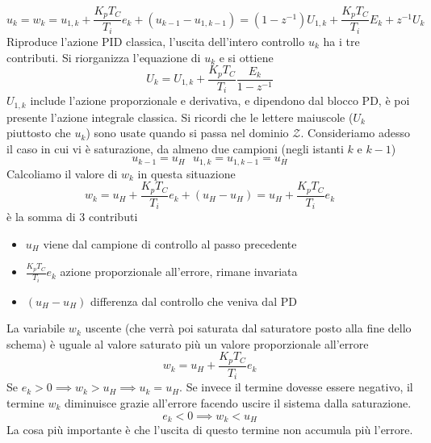 \documentclass[10pt, letterpaper]{report}
\begin{document}
$$ u_k=w_k=u_{1,k}+\frac{K_pT_C}{T_i}e_k+(u_{k-1}-u_{1,k-1})=(1-z^{-1})U_{1,k}+\frac{K_pT_C}{T_i}E_k+z^{-1}U_k$$
Riproduce l'azione PID classica, l'uscita dell'intero controllo $u_k$ ha i tre contributi. Si riorganizza l'equazione di $u_k$ e si ottiene 
$$ U_k=U_{1,k}+\frac{K_pT_C}{T_i}\frac{E_k}{1-z^{-1}}$$
$U_{1,k}$ include l'azione proporzionale e derivativa, e dipendono dal blocco PD, è poi presente l'azione integrale classica. Si ricordi che le lettere maiuscole ($U_k$ piuttosto che $u_k$) sono usate quando si passa nel dominio $\mathcal{Z}$.\acc 
Consideriamo adesso il caso in cui vi è saturazione, da almeno due campioni (negli istanti $k$ e $k-1$)
 $$u_{k-1}=u_H \ \ \ u_{1,k}=u_{1,k-1}=u_H $$
Calcoliamo il valore di $w_k$ in questa situazione 
$$ 
w_k=u_H+\frac{K_pT_C}{T_i}e_k+(u_H-u_H)=u_H+\frac{K_pT_C}{T_i}e_k
$$
è la somma di 3 contributi\begin{itemize}
    \item $u_H$ viene dal campione di controllo al passo precedente
    \item $\frac{K_pT_C}{T_i}e_k$ azione proporzionale all'errore, rimane invariata
    \item $(u_H-u_H)$ differenza dal controllo che veniva dal PD
\end{itemize}
La variabile $w_k$ uscente (che verrà poi saturata dal saturatore posto alla fine dello schema) è uguale al valore saturato più un valore proporzionale all'errore 
$$ 
w_k=u_H+\frac{K_pT_C}{T_i}e_k
$$
Se $e_k>0\implies w_k>u_H\implies u_k = u_H$. Se invece il termine dovesse essere negativo, il termine $w_k$ diminuisce grazie all'errore facendo uscire il sistema dalla saturazione. 
$$ e_k<0\implies w_k<u_H$$
La cosa più importante è che l'uscita di questo termine non accumula più l'errore.
\flowerLine 
\end{document}
